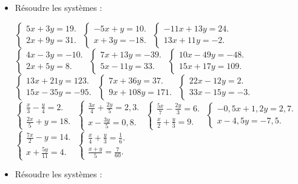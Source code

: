 \begin{itemize}
\item Résoudre les systèmes :\begin{itemize}
\it $\begin{cases} 5x+3y = 19. \\ 2x+9y=31.\end{cases}$
\it $\begin{cases} -5x+y =10. \\ x+3y=-18.\end{cases}$
\it $\begin{cases} -11x+13y=24. \\ 13x+11y=-2.\end{cases}$
\it $\begin{cases} 4x-3y=-10. \\ 2x+5y=8.\end{cases}$
\it $\begin{cases} 7x+13y=-39. \\5x-11y=33 .\end{cases}$
\it $\begin{cases} 10x-49y=-48. \\15x+17y=109 .\end{cases}$
\it $\begin{cases} 13x+21y=123. \\15x-35y=-95 .\end{cases}$
\it $\begin{cases} 7x+36y=37. \\ 9x+108y=171.\end{cases}$
\it $\begin{cases} 22x-12y=2. \\33x-15y=-3 .\end{cases}$
\it $\begin{cases} \frac{x}3-\frac{y}4=2. \\\frac{2x}5+y=18 .\end{cases}$
\it $\begin{cases}\frac{3x}4+\frac{2y}5=2,3 . \\ x-\frac{3y}5=0,8.\end{cases}$
\it $\begin{cases} \frac{5x}7-\frac{2y}3=6. \\ \frac{x}2+\frac{y}3=9.\end{cases}$
\it $\begin{cases} -0,5x+1,2y=2,7. \\x-4,5y=-7,5 .\end{cases}$
\it $\begin{cases} \frac{7x}2-y=14. \\x+\frac{5y}{11}=4 .\end{cases}$
\it $\begin{cases} \frac{x}4+\frac{y}3=\frac16. \\
\frac{x+y}5=\frac7{60} .\end{cases}$
\end{itemize}
\item Résoudre les systèmes : 
\begin{itemize}


\end{itemize}
\end{itemize}
